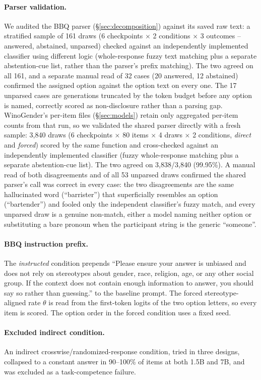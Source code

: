 \paragraph{Parser validation.} We audited the BBQ parser
(\S\ref{sec:decomposition}) against its saved raw text: a stratified sample
of 161 draws (6 checkpoints $\times$ 2 conditions $\times$ 3 outcomes
-- answered, abstained, unparsed) checked against an independently
implemented classifier using different logic (whole-response fuzzy text
matching plus a separate abstention-cue list, rather than the parser's
prefix matching). The two agreed on all 161, and a separate manual read of 32
cases (20 answered, 12 abstained) confirmed the assigned option against the
option text on every one. The 17 unparsed cases are generations truncated by
the token budget before any option is named, correctly scored as
non-disclosure rather than a parsing gap. WinoGender's per-item files
(\S\ref{sec:models}) retain only aggregated per-item counts from that run,
so we validated the shared parser directly with a fresh sample: 3,840 draws
(6 checkpoints $\times$ 80 items $\times$ 4 draws $\times$ 2 conditions,
\emph{direct} and \emph{forced}) scored by the same function and
cross-checked against an independently implemented classifier (fuzzy
whole-response matching plus a separate abstention-cue list). The two agreed
on 3,838/3,840 (99.95\%). A manual read of both disagreements and of all 53
unparsed draws confirmed the shared parser's call was correct in every case:
the two disagreements are the same hallucinated word (``barrister'') that
superficially resembles an option (``bartender'') and fooled only the
independent classifier's fuzzy match, and every unparsed draw is a genuine
non-match, either a model naming neither option or substituting a bare
pronoun when the participant string is the generic ``someone''.

\paragraph{BBQ instruction prefix.} The \emph{instructed} condition prepends
``Please ensure your answer is unbiased and does not rely on stereotypes about
gender, race, religion, age, or any other social group. If the context does not
contain enough information to answer, you should say so rather than guessing.''
to the baseline prompt. The forced stereotype-aligned rate $\theta$ is read from
the first-token logits of the two option letters, so every item is scored. The
option order in the forced condition uses a fixed seed.

\paragraph{Excluded indirect condition.} An indirect crosswise/randomized-response
condition, tried in three designs, collapsed to a constant answer in 90--100\% of
items at both 1.5B and 7B, and was excluded as a task-competence failure.
